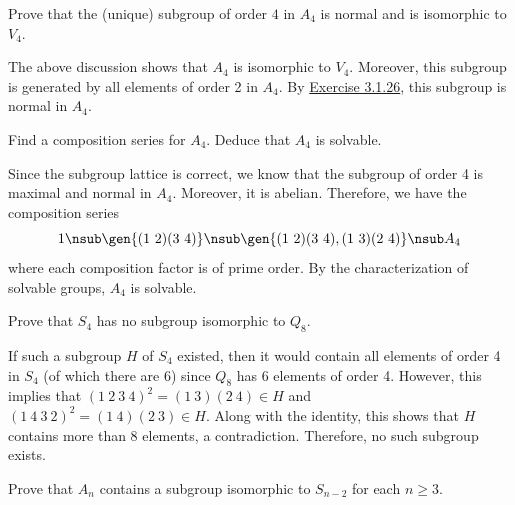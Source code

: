 \begin{exercise}\label{ex3.5.9}
    Prove that the (unique) subgroup of order $4$ in $A_4$ is normal and is isomorphic to $V_4$.
\end{exercise}

\begin{sol}
    The above discussion shows that $A_4$ is isomorphic to $V_4$. Moreover, this subgroup is generated by all elements of order 2 in $A_4$. By \hyperref[ex3.1.26]{Exercise 3.1.26}, this subgroup is normal in $A_4$.
\end{sol}

\newpage

\begin{exercise}\label{ex3.5.10}
    Find a composition series for $A_4$. Deduce that $A_4$ is solvable.
\end{exercise}

\begin{sol}
    Since the subgroup lattice is correct, we know that the subgroup of order 4 is maximal and normal in $A_4$. Moreover, it is abelian. Therefore, we have the composition series
    \[1 \nsub \gen{(1\ 2)(3\ 4)} \nsub \gen{(1\ 2)(3\ 4), (1\ 3)(2\ 4)} \nsub A_4\]
    where each composition factor is of prime order. By the characterization of solvable groups, $A_4$ is solvable.
\end{sol}

\begin{exercise}\label{ex3.5.11}
    Prove that $S_4$ has no subgroup isomorphic to $Q_8$.
\end{exercise}

\begin{sol}
    If such a subgroup $H$ of $S_4$ existed, then it would contain all elements of order 4 in $S_4$ (of which there are 6) since $Q_8$ has 6 elements of order 4. However, this implies that $(1\ 2\ 3\ 4)^2 = (1\ 3)(2\ 4) \in H$ and $(1\ 4\ 3\ 2)^2 = (1\ 4)(2\ 3) \in H$. Along with the identity, this shows that $H$ contains more than 8 elements, a contradiction. Therefore, no such subgroup exists.
\end{sol}

\begin{exercise}\label{ex3.5.12}
    Prove that $A_n$ contains a subgroup isomorphic to $S_{n-2}$ for each $n\ge3$.
\end{exercise}

